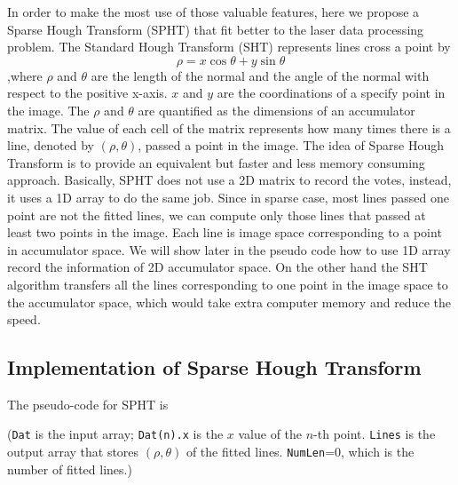 \documentclass{cdcarta4}
\begin{document}
In order to make the most use of those valuable features, here we propose a Sparse Hough Transform (SPHT) that fit better to the laser data processing problem. The Standard Hough Transform (SHT) represents lines cross a point by 
$$ \rho = x \cos\theta + y \sin\theta $$
,where $\rho$ and $\theta$ are the length of the normal and the angle of the normal with respect to the positive x-axis. $x$ and $y$ are the coordinations of a specify point in the image. The $\rho$ and $\theta$ are quantified as the dimensions of an accumulator matrix. The value of each cell of the matrix represents how many times there is a line, denoted by $(\rho, \theta)$, passed a point in the image. The idea of Sparse Hough Transform is to provide an equivalent but faster and less memory consuming approach. Basically, SPHT does not use a 2D matrix to record the votes, instead, it uses a 1D array to do the same job. Since in sparse case, most lines passed one point are not the fitted lines, we can compute only those lines that passed at least two points in the image. Each line is image space corresponding to a point in accumulator space. We will show later in the pseudo code how to use 1D array record the information of 2D accumulator space. On the other hand the SHT algorithm transfers all the lines corresponding to one point in the image space to the accumulator space, which would take extra computer memory and reduce the speed. 
    \subsection{Implementation of Sparse Hough Transform}
The pseudo-code for SPHT is 

(\texttt{Dat} is the input array; \texttt{Dat(n).x} is the $x$ value of the $n$-th point. 
\texttt{Lines} is the output array that stores $(\rho,\theta)$ of the fitted lines.
\texttt{NumLen}=0, which is the number of fitted lines.)
\end{document}
